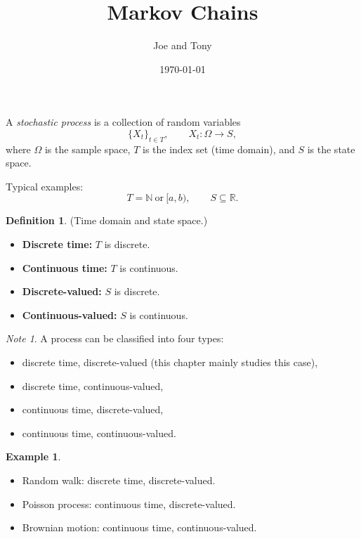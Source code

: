 \documentclass[11pt]{article}
\title{Markov Chains}
\author{Joe and Tony}
\date{\today}
\theoremstyle{plain}
\theoremstyle{definition}
\newtheorem{definition}[theorem]{Definition}
\newtheorem{example}[theorem]{Example}
\theoremstyle{remark}
\newtheorem{note}[theorem]{Note}
\newcommand{\R}{\mathbb{R}}
\newcommand{\N}{\mathbb{N}}
\begin{document}
	\maketitle
	\tableofcontents
	\newpage
	
	
	
	A \emph{stochastic process} is a collection of random variables
	\[
	\{X_t\}_{t\in T},\qquad X_t:\Omega\to S,
	\]
	where \(\Omega\) is the sample space, \(T\) is the index set (time domain), and \(S\) is the state space.
	
	Typical examples:
	\[
	T=\N \ \text{or}\ [a,b),\qquad S\subseteq \R.
	\]
	
	\begin{definition}
		(Time domain and state space.)
		\begin{itemize}[leftmargin=2em]
			\item \textbf{Discrete time:} \(T\) is discrete.
			\item \textbf{Continuous time:} \(T\) is continuous.
			\item \textbf{Discrete-valued:} \(S\) is discrete.
			\item \textbf{Continuous-valued:} \(S\) is continuous.
		\end{itemize}
	\end{definition}
	
	\begin{note}
		A process can be classified into four types:
		\begin{itemize}[leftmargin=2em]
			\item discrete time, discrete-valued (this chapter mainly studies this case),
			\item discrete time, continuous-valued,
			\item continuous time, discrete-valued,
			\item continuous time, continuous-valued.
		\end{itemize}
	\end{note}
	
	\begin{example}
		\begin{itemize}[leftmargin=2em]
			\item Random walk: discrete time, discrete-valued.
			\item Poisson process: continuous time, discrete-valued.
			\item Brownian motion: continuous time, continuous-valued.
		\end{itemize}
	\end{example}
	
\end{document}
